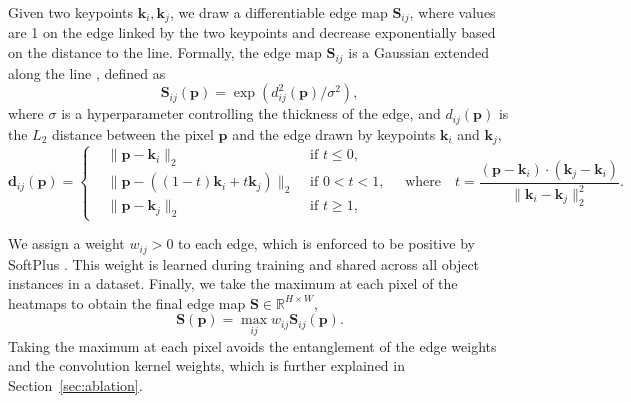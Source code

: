 \documentclass{article}
\newcommand{\R}{\mathbb{R}}
\newcommand{\vd}{\mathbf{d}}
\newcommand{\vk}{\mathbf{k}}
\newcommand{\vp}{\mathbf{p}}
\newcommand{\mS}{\mathbf{S}}
\begin{document}
Given two keypoints $\vk_i, \vk_j$, we draw a differentiable edge map $\mS_{ij}$, where values are 1 on the edge linked by the two keypoints and decrease exponentially based on the distance to the line. Formally, the edge map $\mS_{ij}$ is a Gaussian extended along the line \cite{mihai2021differentiable}, defined as
\begin{equation}
    \mS_{ij}(\vp) = \exp\left(d^2_{ij}(\vp) / \sigma^2\right), 
\end{equation}
where $\sigma$ is a hyperparameter controlling the thickness of the edge, and $d_{ij}(\vp)$ is the $L_2$ distance between the pixel $\vp$ and the edge drawn by keypoints $\vk_i$ and $\vk_j$,
\begin{equation}
\vd_{ij}(\vp) = \left\{
\begin{aligned}
& \|\vp-\vk_i\|_2 &\text{ if } t\leq 0, \\
& \|\vp-((1-t)\vk_i + t\vk_j)\|_2 &\text{ if } 0<t<1, \\
& \|\vp-\vk_j\|_2 &\text{ if } t\geq 1,
\end{aligned}
\right.
\quad \text{where}\quad
t = \frac{(\vp-\vk_i)\cdot (\vk_j-\vk_i)}{\|\vk_i-\vk_j\|^2_2}.
\end{equation}

We assign a weight $w_{ij}>0$ to each edge, which is enforced to be positive by SoftPlus \cite{dugas2000incorporating}. This weight is learned during training and shared across all object instances in a dataset. 
Finally, we take the maximum at each pixel of the heatmaps to obtain the final edge map $\mS\in\R^{H\times W}$,
\begin{equation}
   \mS(\vp)  = \max_{ij}w_{ij}\mS_{ij}(\vp).
   \label{eq:max_heatmap}
\end{equation}
Taking the maximum at each pixel avoids the entanglement of the edge weights and the convolution kernel weights, which is further explained in Section~\ref{sec:ablation}.
\end{document}
